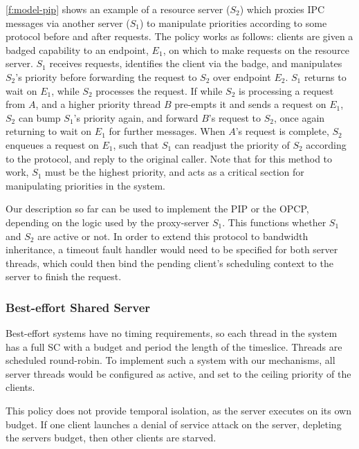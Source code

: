 \cref{f:model-pip} shows an example of a resource server ($S_{2}$) which proxies IPC messages via
another server ($S_{1}$) to manipulate priorities according to some protocol before and after
requests. The policy works as follows: clients are given a badged capability to an endpoint,
$E_{1}$, on which to make requests on the resource server. $S_{1}$ receives requests, identifies 
the client via the badge, and manipulates $S_{2}$'s priority before forwarding the request to
$S_{2}$ over endpoint $E_{2}$. $S_{1}$ returns to wait on $E_{1}$, while $S_{2}$ processes the
request. If while $S_{2}$ is processing a request from $A$, and a higher priority thread $B$
pre-empts it and sends a request on $E_{1}$, $S_{2}$ can bump $S_{1}$'s priority again, and forward
$B$'s request to $S_{2}$, once again returning to wait on $E_{1}$ for further messages. When $A$'s
request is complete, $S_{2}$ enqueues a request on $E_{1}$, such that $S_{1}$ can readjust the
priority of $S_{2}$ according to the protocol, and reply to the original caller. Note that for this
method to work, $S_{1}$ must be the highest priority, and acts as a critical section for
manipulating priorities in the system.

Our description so far can be used to implement the \gls{PIP} or the \gls{OPCP}, depending on 
the logic used by the proxy-server $S_{1}$. This functions whether $S_{1}$ and $S_{2}$ are active or
not. In order to extend this protocol to bandwidth inheritance, a timeout fault handler would need
to be specified for both server threads, which could then bind the pending client's scheduling
context to the server to finish the request. 

\subsubsection{Best-effort Shared Server}
\label{sec:best-effort}

Best-effort systems have no timing requirements, so each thread in the system has a full \gls{SC}
with a budget and period the length of the timeslice. Threads are scheduled round-robin. To
implement such a system with our mechanisms, all server threads would be configured as active, and 
set to the ceiling priority of the clients. 

This policy does not provide temporal isolation, as the server executes on its own budget.  If one
client launches a denial of service attack on the server, depleting the servers budget, then other
clients are starved. 


